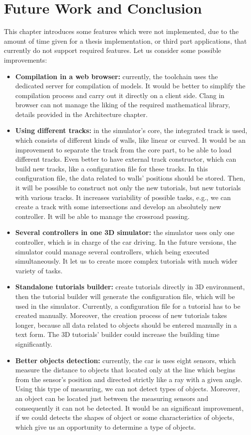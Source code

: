 \chapter{Future Work and Conclusion}
This chapter introduces some features which were not implemented, due to the amount of time given for a thesis implementation, or third part applications, that currently do not support required features. Let us consider some possible improvements: \newline
\begin{itemize}
    \item \textbf{Compilation in a web browser:} currently, the toolchain uses the dedicated server for compilation of models. It would be better to simplify the compilation process and carry out it directly on a client side. Clang in browser can not manage the liking of the required mathematical library, details provided in the Architecture chapter.
    \item \textbf{Using different tracks:} in the simulator's core, the integrated track is used, which consists of different kinds of walls, like linear or curved. It would be an improvement to separate the track from the core part, to be able to load different tracks. Even better to have external track constructor, which can build new tracks, like a configuration file for these tracks. In this configuration file, the data related to walls' positions should be stored. Then, it will be possible to construct not only the new tutorials, but new tutorials with various tracks. It increases variability of possible tasks, e.g., we can create a track with some intersections and develop an absolutely new controller. It will be able to manage the crossroad passing.
    \item \textbf{Several controllers in one 3D simulator:} the simulator uses only one controller, which is in charge of the car driving. In the future versions, the simulator could manage several controllers, which being executed simultaneously. It let us to create more complex tutorials with much wider variety of tasks.
    \item \textbf{Standalone tutorials builder:} create tutorials directly in 3D environment, then the tutorial builder will generate the configuration file, which will be used in the simulator. Currently, a configuration file for a tutorial has to be created manually. Moreover, the creation process of new tutorials takes longer, because all data related to objects should be entered manually in a text form. The 3D tutorials' builder could increase the building time significantly.
    \item \textbf{Better objects detection:} currently, the car is uses eight sensors, which measure the distance to objects that located only at the line which begins from the sensor's position and directed strictly like a ray with a given angle. Using this type of measuring, we can not detect types of objects. Moreover, an object can be located just between the measuring sensors and consequently it can not be detected. It would be an significant improvement, if we could detects the shapes of object or some characteristics of objects, which give us an opportunity to determine a type of objects.
\end{itemize}
